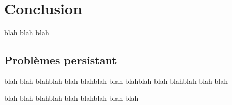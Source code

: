 \chapter{Conclusion}\label{chap:COnc}
blah blah blah
\section{Problèmes persistant}
blah blah blahblah blah blahblah blah blahblah blah blahblah blah blah

blah blah blahblah blah blahblah blah blah




